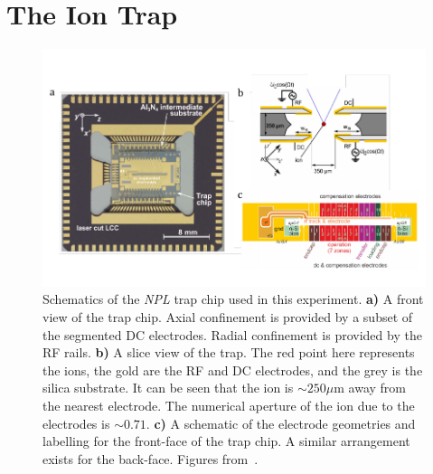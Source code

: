 \section{The Ion Trap}
\label{sec:The Ion Trap}

    \begin{figure}
        \begin{center}
        \noindent\includegraphics[width=\linewidth]{figures/pdf_figure/NPL_trap.pdf}
        \end{center}
        \caption{
            Schematics of the \emph{NPL} trap chip used in this experiment.
            \textbf{a)} A front view of the trap chip. Axial confinement is provided by a subset of the segmented DC electrodes. Radial confinement is provided by the RF rails. 
            \textbf{b)} A slice view of the trap. The red point here represents the ions, the gold are the RF and DC electrodes, and the grey is the silica substrate. It can be seen that the ion is $\sim 250 \mu$m away from the nearest electrode. The numerical aperture of the ion due to the electrodes is $\sim 0.71$.
            \textbf{c)} A schematic of the electrode geometries and labelling for the front-face of the trap chip. A similar arrangement exists for the back-face. 
            Figures from~\cite{choonee_silicon_2017}.
        \label{fig:trap}}
    \end{figure}

